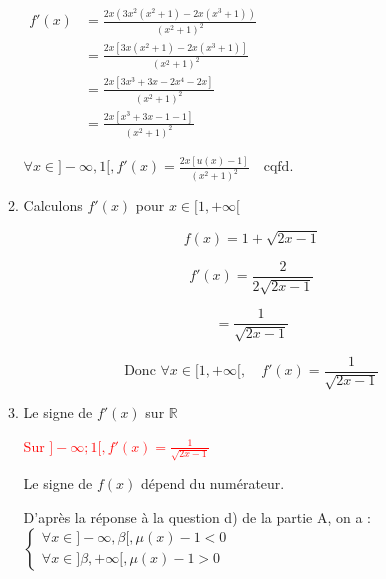 \documentclass[12pt,a4paper]{article}
\begin{document}
\begin{enumerate}
\begin{enumerate}
                    \(
                    \begin{aligned}
                        f'(x) & = \frac{2x \left( 3x^2 (x^2+1) - 2x (x^3+1) \right)}{(x^2+1)^2} \\[10pt]
                              & = \frac{2x \left[ 3x (x^2+1) - 2x (x^3+1) \right]}{(x^2+1)^2}   \\[10pt]
                              & = \frac{2x \left[ 3x^3 + 3x - 2x^4 - 2x \right]}{(x^2+1)^2}     \\[10pt]
                              & = \frac{2x \left[ x^3 + 3x - 1 -1 \right]}{(x^2+1)^2}
                    \end{aligned}
                    \)


                    \( \forall x \in ]-\infty,1[, f'(x) =   \frac{2x\left[u(x)-1\right]}{(x^2+1)^2} \quad \text{cqfd.} \)

              \item  Calculons \( f'(x) \) pour \( x \in [1,+\infty[ \)

                    \[
                        f(x) = 1 + \sqrt{2x - 1}
                    \]

                    \[
                        f'(x) = \frac{2}{2\sqrt{2x - 1}}
                    \]

                    \[
                        = \frac{1}{\sqrt{2x - 1}}
                    \]

                    \[
                        \text{Donc } \forall x \in [1,+\infty[, \quad f'(x) = \frac{1}{\sqrt{2x - 1}}
                    \]
              \item  Le signe de \( f'(x) \) sur \( \mathbb{R} \)

                    \textcolor{red}{ Sur \( ]-\infty; 1[, f'(x) = \frac{1}{\sqrt{2x - 1}} \)}

                    Le signe de \( f(x) \) dépend du numérateur.

                    D'après la réponse à la question d) de la partie A, on a :
                    \(
                    \begin{cases}
                        \forall x \in ] - \infty, \beta [ , \mu(x) - 1 < 0 \\
                            \forall x \in ] \beta, + \infty [, \mu(x) - 1 > 0
                    \end{cases}
                    \)



\end{enumerate}
\end{enumerate}
\end{document}
